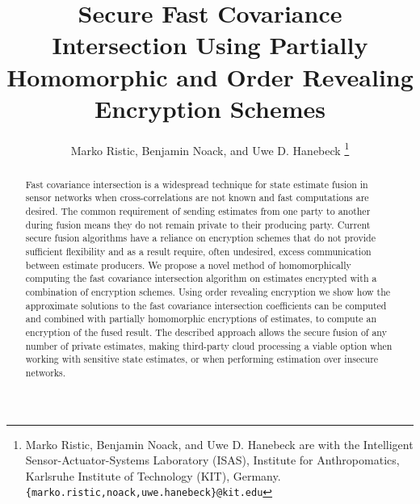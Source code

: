 \documentclass[letterpaper, 10 pt, conference]{ieeeconf}  %
\title{\LARGE \bf
Secure Fast Covariance Intersection Using Partially Homomorphic and Order Revealing Encryption Schemes
}
\author{Marko Ristic, Benjamin Noack, and Uwe D. Hanebeck%
\thanks{Marko Ristic, Benjamin Noack, and Uwe D. Hanebeck are with the Intelligent Sensor-Actuator-Systems Laboratory (ISAS), Institute for Anthropomatics, Karlsruhe Institute of Technology (KIT), Germany.\newline
{\tt\small \{marko.ristic,noack,uwe.hanebeck\}@kit.edu}%
}%
}
\begin{document}
\maketitle
\thispagestyle{empty}
\pagestyle{empty}




\begin{abstract}

Fast covariance intersection is a widespread technique for state estimate fusion in sensor networks when cross-correlations are not known and fast computations are desired. The common requirement of sending estimates from one party to another during fusion means they do not remain private to their producing party. Current secure fusion algorithms have a reliance on encryption schemes that do not provide sufficient flexibility and as a result require, often undesired, excess communication between estimate producers. We propose a novel method of homomorphically computing the fast covariance intersection algorithm on estimates encrypted with a combination of encryption schemes. Using order revealing encryption we show how the approximate solutions to the fast covariance intersection coefficients can be computed and combined with partially homomorphic encryptions of estimates, to compute an encryption of the fused result. The described approach allows the secure fusion of any number of private estimates, making third-party cloud processing a viable option when working with sensitive state estimates, or when performing estimation over insecure networks.

\end{abstract}



\end{document}
